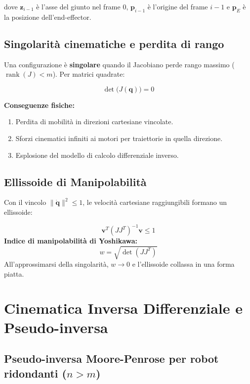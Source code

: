 \documentclass[11pt, a4paper]{article}
\begin{document}
dove $\mathbf{z}_{i-1}$ è l'asse del giunto nel frame 0, $\mathbf{p}_{i-1}$ è l'origine del frame
$i{-}1$ e $\mathbf{p}_E$ è la posizione dell'end-effector.

\subsection{Singolarità cinematiche e perdita di rango}

Una configurazione è \textbf{singolare} quando il Jacobiano perde rango massimo
($\operatorname{rank}(J) < m$). Per matrici quadrate:
\begin{formulabox}
\[
\det\!\bigl(J(\mathbf{q})\bigr) = 0
\]
\end{formulabox}

\textbf{Conseguenze fisiche:}
\begin{enumerate}[itemsep=2pt]
  \item Perdita di mobilità in direzioni cartesiane vincolate.
  \item Sforzi cinematici infiniti ai motori per traiettorie in quella direzione.
  \item Esplosione del modello di calcolo differenziale inverso.
\end{enumerate}

\subsection{Ellissoide di Manipolabilità}

Con il vincolo $\|\dot{\mathbf{q}}\|^2 \le 1$, le velocità cartesiane raggiungibili formano un
ellissoide:
\begin{formulabox}
\[
\mathbf{v}^T(JJ^T)^{-1}\mathbf{v} \le 1
\]
\textbf{Indice di manipolabilità di Yoshikawa:}
\[
w = \sqrt{\det(JJ^T)}
\]
All'approssimarsi della singolarità, $w \to 0$ e l'ellissoide collassa in una forma piatta.
\end{formulabox}

\section{Cinematica Inversa Differenziale e Pseudo-inversa}

\subsection{Pseudo-inversa Moore-Penrose per robot ridondanti ($n > m$)}
\end{document}
